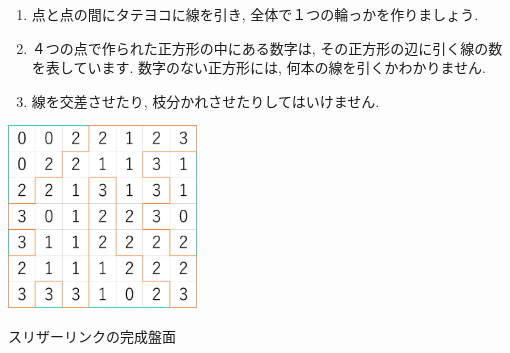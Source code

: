 \begin{enumerate}
  \item 点と点の間にタテヨコに線を引き, 全体で１つの輪っかを作りましょう.
  \item ４つの点で作られた正方形の中にある数字は, その正方形の辺に引く線の数を表しています. 数字のない正方形には, 何本の線を引くかわかりません.
  \item 線を交差させたり, 枝分かれさせたりしてはいけません.
\end{enumerate}

\begin{clearpagefigure}
  \includegraphics[width=5cm]{fig/slitherlink.png}
  \caption{スリザーリンクの完成盤面}
\end{clearpagefigure}

